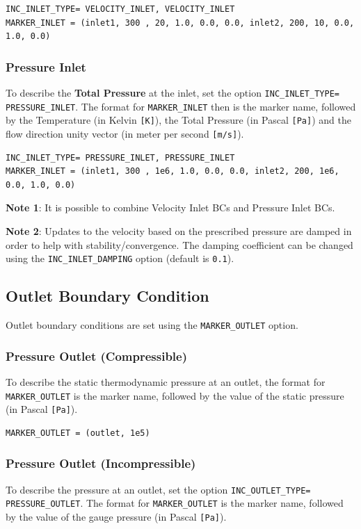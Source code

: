 \documentclass{article}
\begin{document}
\begin{lstlisting}
INC_INLET_TYPE= VELOCITY_INLET, VELOCITY_INLET
MARKER_INLET = (inlet1, 300 , 20, 1.0, 0.0, 0.0, inlet2, 200, 10, 0.0, 1.0, 0.0)
\end{lstlisting}


\subsubsection{Pressure Inlet}
To describe the \textbf{Total Pressure} at the inlet, set the option \verb|INC_INLET_TYPE= PRESSURE_INLET|. The format for \verb|MARKER_INLET| then is the marker name, followed by the Temperature (in Kelvin \verb|[K]|), the Total Pressure (in Pascal \verb|[Pa]|) and the flow direction unity vector (in meter per second \verb|[m/s]|).

\begin{lstlisting}
INC_INLET_TYPE= PRESSURE_INLET, PRESSURE_INLET
MARKER_INLET = (inlet1, 300 , 1e6, 1.0, 0.0, 0.0, inlet2, 200, 1e6, 0.0, 1.0, 0.0)
\end{lstlisting}

\textbf{Note 1}: It is possible to combine Velocity Inlet BCs and Pressure Inlet BCs.

\textbf{Note 2}: Updates to the velocity based on the prescribed pressure are damped in order to help with stability/convergence. The damping coefficient can be changed using the \verb|INC_INLET_DAMPING| option (default is \verb|0.1|).


\subsection{Outlet Boundary Condition}
Outlet boundary conditions are set using the \verb|MARKER_OUTLET| option.


\subsubsection{Pressure Outlet (Compressible)}
To describe the static thermodynamic pressure at an outlet, the format for \verb|MARKER_OUTLET| is the marker name, followed by the value of the static pressure (in Pascal \verb|[Pa]|).

\begin{lstlisting}
MARKER_OUTLET = (outlet, 1e5)
\end{lstlisting}


\subsubsection{Pressure Outlet (Incompressible)}
To describe the pressure at an outlet, set the option \verb|INC_OUTLET_TYPE= PRESSURE_OUTLET|. The format for \verb|MARKER_OUTLET| is the marker name, followed by the value of the gauge pressure (in Pascal \verb|[Pa]|).
\end{document}
